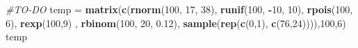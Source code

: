 \documentclass[]{article}
\newenvironment{Shaded}{\begin{snugshade}}{\end{snugshade}}
\newcommand{\KeywordTok}[1]{\textcolor[rgb]{0.13,0.29,0.53}{\textbf{#1}}}
\newcommand{\DecValTok}[1]{\textcolor[rgb]{0.00,0.00,0.81}{#1}}
\newcommand{\FloatTok}[1]{\textcolor[rgb]{0.00,0.00,0.81}{#1}}
\newcommand{\StringTok}[1]{\textcolor[rgb]{0.31,0.60,0.02}{#1}}
\newcommand{\CommentTok}[1]{\textcolor[rgb]{0.56,0.35,0.01}{\textit{#1}}}
\newcommand{\OperatorTok}[1]{\textcolor[rgb]{0.81,0.36,0.00}{\textbf{#1}}}
\newcommand{\NormalTok}[1]{#1}
\begin{document}
\begin{Shaded}
\begin{Highlighting}[]
\CommentTok{#TO-DO}
\NormalTok{temp =}\StringTok{ }\KeywordTok{matrix}\NormalTok{(}\KeywordTok{c}\NormalTok{(}\KeywordTok{rnorm}\NormalTok{(}\DecValTok{100}\NormalTok{, }\DecValTok{17}\NormalTok{, }\DecValTok{38}\NormalTok{), }\KeywordTok{runif}\NormalTok{(}\DecValTok{100}\NormalTok{, }\OperatorTok{-}\DecValTok{10}\NormalTok{, }\DecValTok{10}\NormalTok{), }\KeywordTok{rpois}\NormalTok{(}\DecValTok{100}\NormalTok{, }\DecValTok{6}\NormalTok{), }\KeywordTok{rexp}\NormalTok{(}\DecValTok{100}\NormalTok{,}\DecValTok{9}\NormalTok{) , }\KeywordTok{rbinom}\NormalTok{(}\DecValTok{100}\NormalTok{, }\DecValTok{20}\NormalTok{, }\FloatTok{0.12}\NormalTok{), }\KeywordTok{sample}\NormalTok{(}\KeywordTok{rep}\NormalTok{(}\KeywordTok{c}\NormalTok{(}\DecValTok{0}\NormalTok{,}\DecValTok{1}\NormalTok{), }\KeywordTok{c}\NormalTok{(}\DecValTok{76}\NormalTok{,}\DecValTok{24}\NormalTok{)))),}\DecValTok{100}\NormalTok{,}\DecValTok{6}\NormalTok{)}
\NormalTok{temp}
\end{Highlighting}
\end{Shaded}
\end{document}

